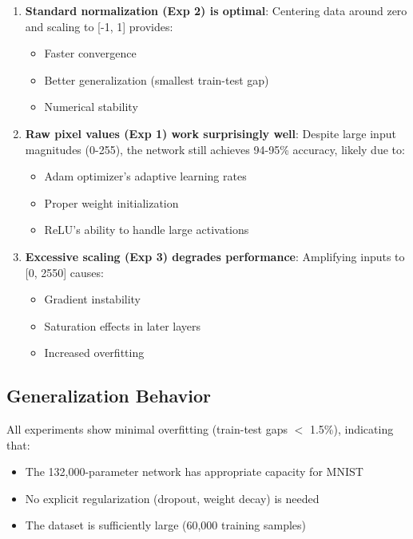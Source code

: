 \documentclass[11pt,a4paper]{article}
\begin{document}
\begin{enumerate}
    \item \textbf{Standard normalization (Exp 2) is optimal}: Centering data around zero and scaling to [-1, 1] provides:
    \begin{itemize}
        \item Faster convergence
        \item Better generalization (smallest train-test gap)
        \item Numerical stability
    \end{itemize}
    
    \item \textbf{Raw pixel values (Exp 1) work surprisingly well}: Despite large input magnitudes (0-255), the network still achieves 94-95\% accuracy, likely due to:
    \begin{itemize}
        \item Adam optimizer's adaptive learning rates
        \item Proper weight initialization
        \item ReLU's ability to handle large activations
    \end{itemize}
    
    \item \textbf{Excessive scaling (Exp 3) degrades performance}: Amplifying inputs to [0, 2550] causes:
    \begin{itemize}
        \item Gradient instability
        \item Saturation effects in later layers
        \item Increased overfitting
    \end{itemize}
\end{enumerate}

\subsection{Generalization Behavior}

All experiments show minimal overfitting (train-test gaps $<$ 1.5\%), indicating that:
\begin{itemize}
    \item The 132,000-parameter network has appropriate capacity for MNIST
    \item No explicit regularization (dropout, weight decay) is needed
    \item The dataset is sufficiently large (60,000 training samples)
\end{itemize}
\end{document}
